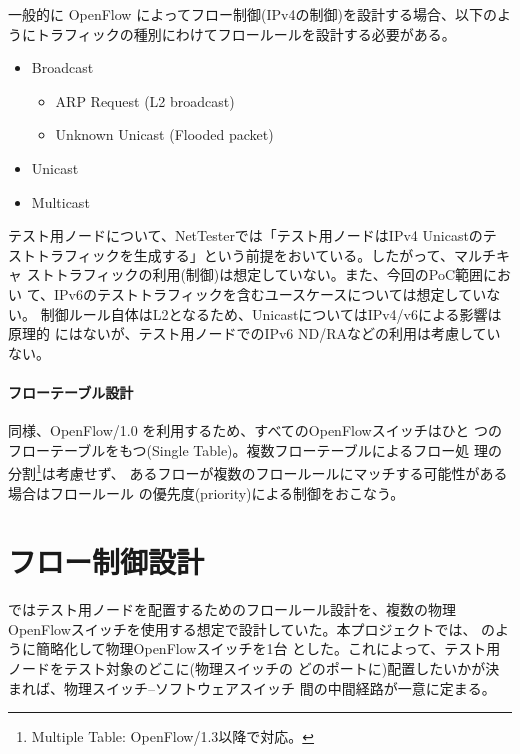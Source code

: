 一般的に OpenFlow によってフロー制御(IPv4の制御)を設計する場合、以下のよ
うにトラフィックの種別にわけてフロールールを設計する必要がある。
\begin{itemize}
 \item Broadcast
       \begin{itemize}
        \item ARP Request (L2 broadcast)
        \item Unknown Unicast (Flooded packet)
       \end{itemize}
 \item Unicast
 \item Multicast
\end{itemize}

テスト用ノードについて、NetTesterでは「テスト用ノードはIPv4 Unicastのテ
ストトラフィックを生成する」という前提をおいている。したがって、マルチキャ
ストトラフィックの利用(制御)は想定していない。また、今回のPoC範囲におい
て、IPv6のテストトラフィックを含むユースケースについては想定していない。
制御ルール自体はL2となるため、UnicastについてはIPv4/v6による影響は原理的
にはないが、テスト用ノードでのIPv6 ND/RAなどの利用は考慮していない。

    \paragraph{フローテーブル設計}

\lopj 同様、OpenFlow/1.0 を利用するため、すべてのOpenFlowスイッチはひと
つのフローテーブルをもつ(Single Table)。複数フローテーブルによるフロー処
理の分割\footnote{Multiple Table: OpenFlow/1.3以降で対応。}は考慮せず、
あるフローが複数のフロールールにマッチする可能性がある場合はフロールール
の優先度(priority)による制御をおこなう。

 \section{フロー制御設計}
 \label{sec:flow-design}

\lopj ではテスト用ノードを配置するためのフロールール設計を、複数の物理
OpenFlowスイッチを使用する想定で設計していた。本プロジェクトでは、
のように簡略化して物理OpenFlowスイッチを1台
とした。これによって、テスト用ノードをテスト対象のどこに(物理スイッチの
どのポートに)配置したいかが決まれば、物理スイッチ--ソフトウェアスイッチ
間の中間経路が一意に定まる。

